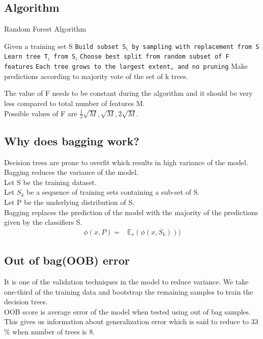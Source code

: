 \documentclass[12pt,letterpaper, onecolumn]{exam}
\begin{document}
\subsection*{Algorithm}
\begin{algorithm}
\caption{Random Forest Algorithm}\label{cap}
\begin{algorithmic}

\State Given a training set S
        \State \texttt{Build subset S$_i$ by sampling with replacement from S}
        \State \texttt{Learn tree T$_i$
from S$_i$}
\State \texttt{Choose best split from random subset of F features}
\State \texttt{Each tree grows to the largest extent, and no pruning}
\EndFor
      \EndFor
\State Make predictions according to majority vote of the set of k trees.
\end{algorithmic}
\end{algorithm}

The value of F needs to be constant during the algorithm and it should be very less compared to total number of features M.
\\Possible values of F are $\frac{1}{2}\sqrt{M},\sqrt{M},2\sqrt{M}$.



\subsection*{Why does bagging work?}
Decision trees are prone to overfit which results in high variance of the model. Bagging reduces the variance of the model.\\
Let S be the training dataset. \\
Let ${S_k}$ be a sequence of training sets containing a sub-set of S.\\
 Let P be the underlying distribution of S.\\
Bagging replaces the prediction of the model with the majority of 
the predictions given by the classifiers S.
\begin{align}
\phi(x,P) = {}& \mathbb{E}_s(\phi(x,S_k)))
\end{align}

\subsection*{Out of bag(OOB) error}
It is one of the validation techniques in the model to reduce variance. We take one-third of the training data and bootstrap the remaining samples to train the decision trees.\\
OOB score is average error of the model when tested using out of bag samples.\\This gives us information about generalization error which is said to reduce to 33$\%$ when number of trees is 8.
\end{document}
